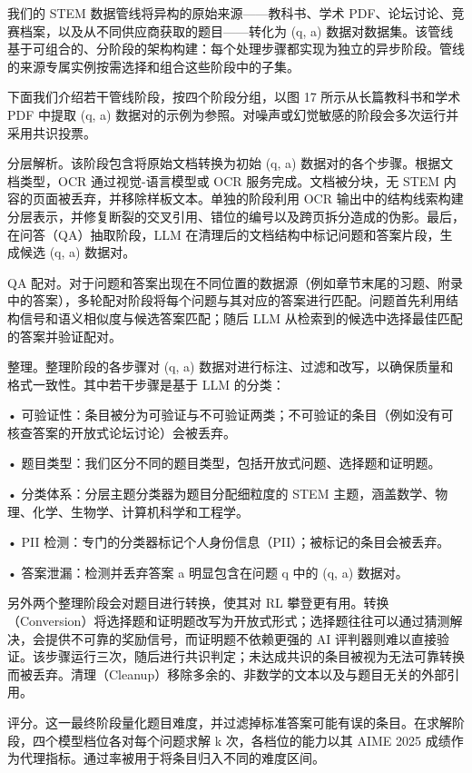 \documentclass[
  10
]{article}
\begin{document}
我们的 STEM 数据管线将异构的原始来源——教科书、学术 PDF、论坛讨论、竞赛档案，以及从不同供应商获取的题目——转化为 (q, a) 数据对数据集。该管线基于可组合的、分阶段的架构构建：每个处理步骤都实现为独立的异步阶段。管线的来源专属实例按需选择和组合这些阶段中的子集。

下面我们介绍若干管线阶段，按四个阶段分组，以图 17 所示从长篇教科书和学术 PDF 中提取 (q, a) 数据对的示例为参照。对噪声或幻觉敏感的阶段会多次运行并采用共识投票。

分层解析。该阶段包含将原始文档转换为初始 (q, a) 数据对的各个步骤。根据文档类型，OCR 通过视觉-语言模型或 OCR 服务完成。文档被分块，无 STEM 内容的页面被丢弃，并移除样板文本。单独的阶段利用 OCR 输出中的结构线索构建分层表示，并修复断裂的交叉引用、错位的编号以及跨页拆分造成的伪影。最后，在问答（QA）抽取阶段，LLM 在清理后的文档结构中标记问题和答案片段，生成候选 (q, a) 数据对。

QA 配对。对于问题和答案出现在不同位置的数据源（例如章节末尾的习题、附录中的答案），多轮配对阶段将每个问题与其对应的答案进行匹配。问题首先利用结构信号和语义相似度与候选答案匹配；随后 LLM 从检索到的候选中选择最佳匹配的答案并验证配对。

整理。整理阶段的各步骤对 (q, a) 数据对进行标注、过滤和改写，以确保质量和格式一致性。其中若干步骤是基于 LLM 的分类：

• 可验证性：条目被分为可验证与不可验证两类；不可验证的条目（例如没有可核查答案的开放式论坛讨论）会被丢弃。

• 题目类型：我们区分不同的题目类型，包括开放式问题、选择题和证明题。

• 分类体系：分层主题分类器为题目分配细粒度的 STEM 主题，涵盖数学、物理、化学、生物学、计算机科学和工程学。

• PII 检测：专门的分类器标记个人身份信息（PII）；被标记的条目会被丢弃。



• 答案泄漏：检测并丢弃答案 a 明显包含在问题 q 中的 (q, a) 数据对。

另外两个整理阶段会对题目进行转换，使其对 RL 攀登更有用。转换（Conversion）将选择题和证明题改写为开放式形式；选择题往往可以通过猜测解决，会提供不可靠的奖励信号，而证明题不依赖更强的 AI 评判器则难以直接验证。该步骤运行三次，随后进行共识判定；未达成共识的条目被视为无法可靠转换而被丢弃。清理（Cleanup）移除多余的、非数学的文本以及与题目无关的外部引用。

评分。这一最终阶段量化题目难度，并过滤掉标准答案可能有误的条目。在求解阶段，四个模型档位各对每个问题求解 k 次，各档位的能力以其 AIME 2025 成绩作为代理指标。通过率被用于将条目归入不同的难度区间。
\end{document}
